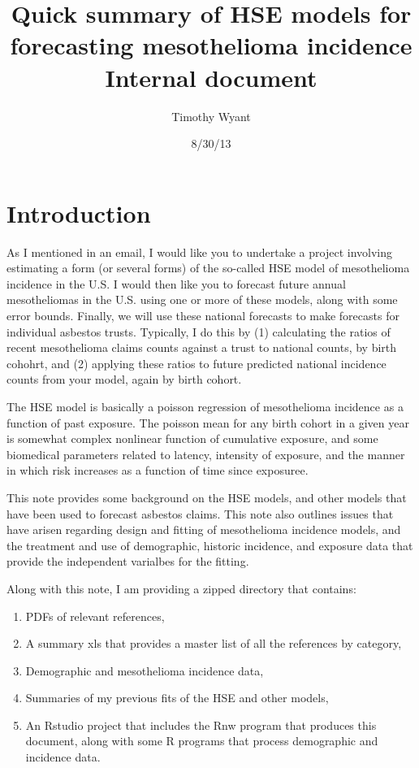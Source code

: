 \documentclass{article}\usepackage{graphicx, color}
\begin{document}
\title{ Quick summary of HSE models for forecasting mesothelioma incidence \\ Internal document  }
\author{Timothy Wyant}
\date{ 8/30/13}
\maketitle

\tableofcontents
\listoffigures

\section{Introduction}
As I mentioned in an email, I would like you to undertake a project involving estimating a form (or several forms) of the so-called HSE model of mesothelioma incidence in the U.S.  I would then like you to forecast future annual mesotheliomas in the U.S. using one or more of these models, along with some error bounds.  Finally, we will use these national forecasts to make forecasts for individual asbestos trusts.  Typically, I do this by (1) calculating the ratios of recent mesothelioma claims counts against a trust to national counts, by birth cohohrt, and (2) applying these ratios to future predicted national incidence counts from your model, again by birth cohort.

The HSE model is basically a poisson regression of mesothelioma incidence as a function of past exposure.  The poisson mean for any birth cohort in a given year is somewhat complex nonlinear function of cumulative exposure, and some biomedical parameters related to latency, intensity of exposure, and the manner in which risk increases as a function of time since exposuree.  

This note provides some background on the HSE models, and other models that have been used to forecast asbestos claims. This note also outlines issues that have arisen regarding design and fitting of mesothelioma incidence models, and the treatment and use of demographic, historic incidence, and exposure data that provide the independent varialbes for the fitting.

Along with this note, I am providing a zipped directory that contains: 

\begin{enumerate}
  \item PDFs of relevant references,
  \item A summary xls that provides a master list of all the references by category,
  \item Demographic and mesothelioma incidence data,
  \item Summaries of my previous fits of the HSE and other models,
  \item An Rstudio project that includes the Rnw program that produces this document, along with some R programs that process demographic and incidence data.
\end{enumerate}
\end{document}
